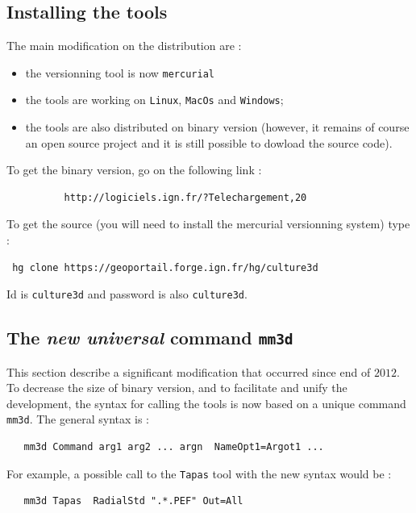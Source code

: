 \subsection{Installing the tools}

The main modification on the distribution are :

\begin{itemize}
   \item  the versionning tool is now {\tt mercurial}
   \item  the tools are working on {\tt Linux}, {\tt MacOs} and  {\tt Windows};
   \item  the tools are also distributed on binary  version (however, it  remains of course
          an open source project and it is still possible to dowload the source code).
\end{itemize}

To get the binary version, go on the following link :

\begin{verbatim}
          http://logiciels.ign.fr/?Telechargement,20
\end{verbatim}

To get the source (you will need to install the mercurial versionning system) type :

\begin{verbatim}
 hg clone https://geoportail.forge.ign.fr/hg/culture3d 
\end{verbatim}

Id is {\tt culture3d} and password is also  {\tt culture3d}.


\subsection{The \emph{new universal} command {\tt mm3d}}

This section describe a significant modification that occurred since end of $2012$. To decrease the
size of binary version, and to facilitate and unify the development, the syntax for calling the tools is now
based on a unique command {\tt mm3d}. The general syntax is :

\begin{verbatim}
   mm3d Command arg1 arg2 ... argn  NameOpt1=Argot1 ...
\end{verbatim}

For example, a possible call to the {\tt Tapas} tool with the new syntax would be :

\begin{verbatim}
   mm3d Tapas  RadialStd ".*.PEF" Out=All
\end{verbatim}


